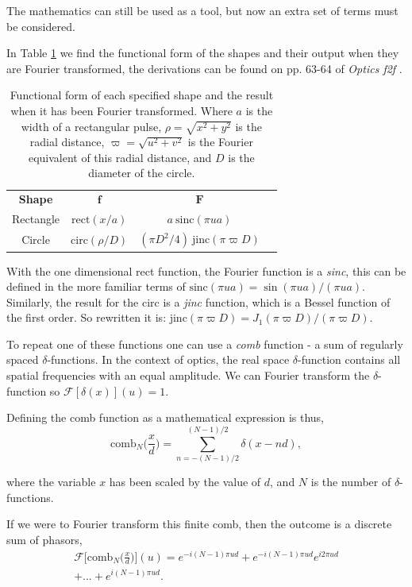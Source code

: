 \documentclass[twocolumn]{revtex4}
\begin{document}
The mathematics can still be used as a tool, but now an extra set of terms must be considered.

In Table \ref{fshapes} we find the functional form of the shapes and their output when they are Fourier transformed, the derivations can be found on pp. 63-64 of \textit{Optics f2f} \cite{of2f}. 
\begin{table}[h!]
\centering
\begin{tabular}{c@{\hskip 20pt}c@{\hskip 20pt}c@{\hskip 10pt}c} 
 \hline
 \textbf{Shape} 	& \textbf{$\boldsymbol{f}$} 		& \textbf{$\boldsymbol{F}$} \\ [1ex] 
 Rectangle 	& $\text{rect}(x/a)$ 				& $a\: \text{sinc}(\pi ua)$ \\ 
 Circle 		& $\text{circ}(\rho/D)$ 			& $(\pi D^2/4)\: \text{jinc}(\pi \varpi D)$ \\
 \hline
\end{tabular}
\caption{Functional form of each specified shape and the result when it has been Fourier transformed. Where $a$ is the width of a rectangular pulse, $\rho=\sqrt{x^2+y^2}$ is the radial distance, $\varpi=\sqrt{u^2+v^2}$ is the Fourier equivalent of this radial distance, and $D$ is the diameter of the circle.}
\label{fshapes}
\end{table}

With the one dimensional rect function, the Fourier function is a \textit{sinc}, this can be defined in the more familiar terms of $\text{sinc}(\pi ua)=\sin (\pi ua)/(\pi ua)$. Similarly, the result for the circ is a \textit{jinc} function, which is a Bessel function of the first order. So rewritten it is: $\text{jinc}(\pi \varpi D)=J_1 (\pi \varpi D)/(\pi \varpi D)$.

To repeat one of these functions one can use a \textit{comb} function - a sum of regularly spaced $\delta$-functions. In the context of optics, the real space $\delta$-function contains all spatial frequencies with an equal amplitude. We can Fourier transform the $\delta$-function so $\mathcal{F}[\delta(x)](u)=1$.

Defining the comb function as a mathematical expression is thus,
\begin{equation}
\text{comb}_N \Big(\frac{x}{d}\Big) = \sum_{n=-(N-1)/2}^{(N-1)/2} \delta(x-nd),
\end{equation}

where the variable $x$ has been scaled by the value of $d$, and $N$ is the number of $\delta$-functions.

If we were to Fourier transform this finite comb, then the outcome is a discrete sum of phasors, 
\begin{multline}
\mathcal{F}\Big[\text{comb}_N\Big(\frac{x}{d}\Big)\Big](u)=e^{-i(N-1)\pi ud} + e^{-i(N-1)\pi ud}e^{i2\pi ud}\\+...+e^{i(N-1)\pi ud}.
\end{multline}
\end{document}

